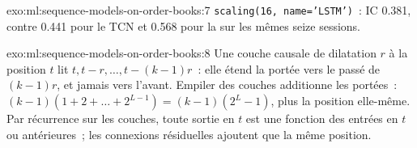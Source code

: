 \begin{solution}{exo:ml:sequence-models-on-order-books:7}
\texttt{scaling(16, name='LSTM')}~: IC 0.381, contre 0.441 pour le TCN et 0.568 pour la  sur les mêmes
seize sessions.
\end{solution}

\begin{solution}{exo:ml:sequence-models-on-order-books:8}
Une couche causale de dilatation $r$ à la position $t$ lit $t, t - r,\dots, t - (k-1)r$~: elle étend la portée vers le passé de
$(k-1)r$, et jamais vers l'avant. Empiler des couches additionne les portées~: $(k-1)(1 + 2 + \dots + 2^{L-1}) = (k-1)(2^L - 1)$, plus la
position elle-même. Par récurrence sur les couches, toute sortie en $t$ est une fonction des entrées en $t$ ou antérieures~; les connexions résiduelles
ajoutent que la même position.
\end{solution}

